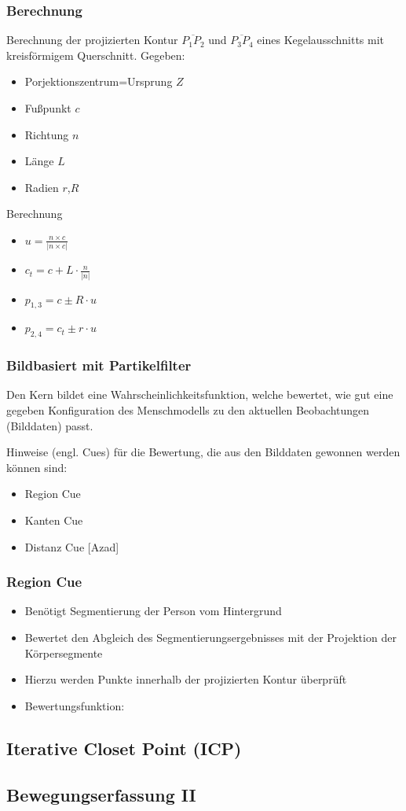 \subsubsection{Berechnung}
Berechnung der projizierten Kontur $\overline{P_1 P_2}$ und $\overline{P_3 P_4}$ eines Kegelausschnitts mit kreisförmigem Querschnitt.
Gegeben:
\begin{itemize}
	\item Porjektionszentrum=Ursprung $Z$
	\item Fußpunkt $c$
	\item Richtung $n$
	\item Länge $L$
	\item Radien $r$,$R$
\end{itemize}
Berechnung
\begin{itemize}
	\item $u=\frac{n\times c}{\left|n\times c\right|}$
	\item $c_t=c+L \cdot \frac{n}{\left|n\right|}$
	\item $p_{1,3}=c \pm R \cdot u$
	\item $p_{2,4}=c_t \pm r \cdot u$
\end{itemize}
\subsubsection{Bildbasiert mit Partikelfilter}
Den Kern bildet eine Wahrscheinlichkeitsfunktion, welche bewertet, wie gut eine gegeben Konfiguration des Menschmodells zu den aktuellen Beobachtungen (Bilddaten) passt.

Hinweise (engl. Cues) für die Bewertung, die aus den Bilddaten gewonnen werden können sind:
\begin{itemize}
	\item Region Cue \cite{Deutscher.2000}
	\item Kanten Cue \cite{Deutscher.2000}
	\item Distanz Cue [Azad]
\end{itemize}
\subsubsection{Region Cue}
\begin{itemize}
	\item Benötigt Segmentierung der Person vom Hintergrund
	\item Bewertet den Abgleich des Segmentierungsergebnisses mit der Projektion der Körpersegmente
	\item Hierzu werden Punkte innerhalb der projizierten Kontur überprüft
	\item Bewertungsfunktion:
\end{itemize}
\subsection{Iterative Closet Point (ICP)}
\subsection{Bewegungserfassung II}












